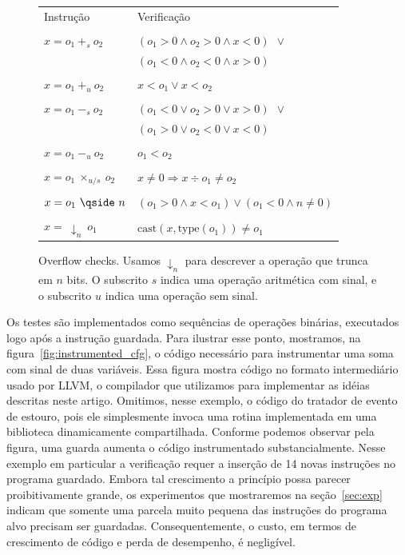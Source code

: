 \documentclass{llncs}
\begin{document}
\begin{figure}[t!]
\begin{center}
\begin{tabular}{ll}
Instrução & Verificação \\ \\
$x = o_1 \ +_s \ o_2$ & $(o_1 > 0 \wedge o_2 > 0 \wedge x < 0) \ \ \vee$ \\
                      & $(o_1 < 0 \wedge o_2 < 0 \wedge x > 0)$ \\ \\
$x = o_1 \ +_u \ o_2$ & $x < o_1 \vee x < o_2$ \\ \\
$x = o_1 \ -_s \ o_2$ & $(o_1 < 0 \vee o_2 > 0 \vee x > 0) \ \ \vee$ \\
                      & $(o_1 > 0 \vee o_2 < 0 \vee x < 0)$ \\ \\
$x = o_1 \ -_u \ o_2$ & $o_1 < o_2$ \\ \\
$x = o_1 \ \times_{u/s} \ o_2$ & $x \neq 0 \Rightarrow x \div o_1 \neq o_2$ \\ \\
$x = o_1 \ \qside \ n$ & $(o_1 > 0 \wedge x < o_1) \vee (o_1 < 0 \wedge n \neq 0)$ \\ \\
$x = \ \downarrow_n \ o_1$ & $\mbox{cast}(x, \mbox{type}(o_1)) \neq o_1$ \\
\end{tabular}
\end{center}
\caption{\label{fig:ovfCheck}Overflow checks. Usamos $\downarrow_n$ para
descrever a operação que trunca em $n$ bits.
O subscrito $s$ indica uma operação aritmética com sinal, e o subscrito $u$
indica uma operação sem sinal.}
\end{figure}

Os testes são implementados como sequências de operações binárias, executados
logo após a instrução guardada.
Para ilustrar esse ponto, mostramos, na figura~\ref{fig:instrumented_cfg},
o código necessário para instrumentar uma soma com sinal de duas variáveis.
Essa figura mostra código no formato intermediário usado por LLVM, o compilador
que utilizamos para implementar as idéias descritas neste artigo.
Omitimos, nesse exemplo, o código do tratador de evento de estouro, pois ele
simplesmente invoca uma rotina implementada em uma biblioteca
dinamicamente compartilhada.
Conforme podemos observar pela figura, uma guarda aumenta o código instrumentado
substancialmente.
Nesse exemplo em particular a verificação requer a inserção de 14 novas
instruções no programa guardado.
Embora tal crescimento a princípio possa parecer proibitivamente grande,
os experimentos que mostraremos na seção~\ref{sec:exp} indicam que somente
uma parcela muito pequena das instruções do programa alvo precisam ser
guardadas.
Consequentemente, o custo, em termos de crescimento de código e perda de
desempenho, é negligível.
\end{document}
